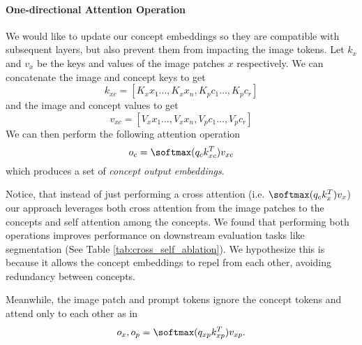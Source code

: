\paragraph{One-directional Attention Operation}
We would like to update our concept embeddings so they are compatible with subsequent layers, but also prevent them from impacting the image tokens. 
Let $k_x$ and $v_x$ be the keys and values of the image patches $x$ respectively. We can concatenate the image and concept keys to get
\begin{equation}
    k_{xc} = [K_x x_1 \dots, K_x x_n, K_p c_1 \dots, K_p c_r]
\end{equation}
and the image and concept values to get
\begin{equation}
    v_{xc} = [V_x x_1 \dots, V_x x_n, V_p c_1 \dots, V_p c_r]
\end{equation}
We can then perform the following attention operation 
\begin{equation}
    o_{c} = \softmax(q_{c} k_{xc}^T) v_{xc}
\end{equation}
which produces a set of \textit{concept output embeddings}. 

Notice, that instead of just performing a cross attention (i.e. $\softmax(q_{c} k_{x}^T) v_{x}$) our approach leverages both cross attention from the image patches to the concepts and self attention among the concepts. We found that performing both operations improves performance on downstream evaluation tasks like segmentation (See Table \ref{tab:cross_self_ablation}).  We hypothesize this is because it allows the concept embeddings to repel from each other, avoiding redundancy between concepts.

Meanwhile, the image patch and prompt tokens ignore the concept tokens and attend only to each other as in 
\begin{equation}
    o_x, o_p = \softmax(q_{xp} k_{xp}^T) v_{xp} .
\end{equation}


